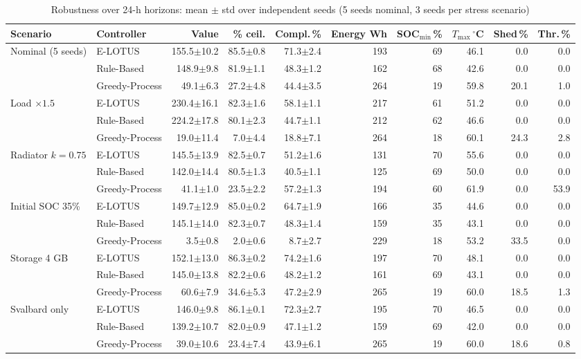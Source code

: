 \begin{table}[t]
\centering
\caption{Robustness over 24-h horizons: mean $\pm$ std over independent seeds (5 seeds nominal, 3 seeds per stress scenario)}\label{tab:stress}
\footnotesize
\setlength{\tabcolsep}{3.0pt}
\begin{tabular}{@{}llrrrrrrrr@{}}
\toprule
Scenario & Controller & Value & \% ceil. & Compl.\,\% & Energy Wh & SOC$_{\min}$\,\% & $T_{\max}$\,$^\circ$C & Shed\,\% & Thr.\,\%\\
\midrule
\multirow{3}{*}{Nominal (5 seeds)} & E-LOTUS & 155.5$\pm$10.2 & 85.5$\pm$0.8 & 71.3$\pm$2.4 & 193 & 69 & 46.1 & 0.0 & 0.0\\
 & Rule-Based & 148.9$\pm$9.8 & 81.9$\pm$1.1 & 48.3$\pm$1.2 & 162 & 68 & 42.6 & 0.0 & 0.0\\
 & Greedy-Process & 49.1$\pm$6.3 & 27.2$\pm$4.8 & 44.4$\pm$3.5 & 264 & 19 & 59.8 & 20.1 & 1.0\\
\midrule
\multirow{3}{*}{Load $\times1.5$} & E-LOTUS & 230.4$\pm$16.1 & 82.3$\pm$1.6 & 58.1$\pm$1.1 & 217 & 61 & 51.2 & 0.0 & 0.0\\
 & Rule-Based & 224.2$\pm$17.8 & 80.1$\pm$2.3 & 44.7$\pm$1.1 & 212 & 62 & 46.6 & 0.0 & 0.0\\
 & Greedy-Process & 19.0$\pm$11.4 & 7.0$\pm$4.4 & 18.8$\pm$7.1 & 264 & 18 & 60.1 & 24.3 & 2.8\\
\midrule
\multirow{3}{*}{Radiator $k=0.75$} & E-LOTUS & 145.5$\pm$13.9 & 82.5$\pm$0.7 & 51.2$\pm$1.6 & 131 & 70 & 55.6 & 0.0 & 0.0\\
 & Rule-Based & 142.0$\pm$14.4 & 80.5$\pm$1.3 & 40.5$\pm$1.1 & 125 & 69 & 50.0 & 0.0 & 0.0\\
 & Greedy-Process & 41.1$\pm$1.0 & 23.5$\pm$2.2 & 57.2$\pm$1.3 & 194 & 60 & 61.9 & 0.0 & 53.9\\
\midrule
\multirow{3}{*}{Initial SOC 35\%} & E-LOTUS & 149.7$\pm$12.9 & 85.0$\pm$0.2 & 64.7$\pm$1.9 & 166 & 35 & 44.6 & 0.0 & 0.0\\
 & Rule-Based & 145.1$\pm$14.0 & 82.3$\pm$0.7 & 48.3$\pm$1.4 & 159 & 35 & 43.1 & 0.0 & 0.0\\
 & Greedy-Process & 3.5$\pm$0.8 & 2.0$\pm$0.6 & 8.7$\pm$2.7 & 229 & 18 & 53.2 & 33.5 & 0.0\\
\midrule
\multirow{3}{*}{Storage 4 GB} & E-LOTUS & 152.1$\pm$13.0 & 86.3$\pm$0.2 & 74.2$\pm$1.6 & 197 & 70 & 48.1 & 0.0 & 0.0\\
 & Rule-Based & 145.0$\pm$13.8 & 82.2$\pm$0.6 & 48.2$\pm$1.2 & 161 & 69 & 43.1 & 0.0 & 0.0\\
 & Greedy-Process & 60.6$\pm$7.9 & 34.6$\pm$5.3 & 47.2$\pm$2.9 & 265 & 19 & 60.0 & 18.5 & 1.3\\
\midrule
\multirow{3}{*}{Svalbard only} & E-LOTUS & 146.0$\pm$9.8 & 86.1$\pm$0.1 & 72.3$\pm$2.7 & 195 & 70 & 46.5 & 0.0 & 0.0\\
 & Rule-Based & 139.2$\pm$10.7 & 82.0$\pm$0.9 & 47.1$\pm$1.2 & 159 & 69 & 42.0 & 0.0 & 0.0\\
 & Greedy-Process & 39.0$\pm$10.6 & 23.4$\pm$7.4 & 43.9$\pm$6.1 & 265 & 19 & 60.0 & 18.6 & 0.8\\
\bottomrule
\end{tabular}
\end{table}
